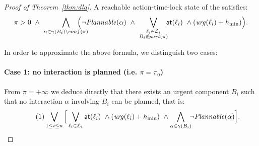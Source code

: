\begin{proof}[Proof of Theorem~\ref{thm:dla}]
A reachable action-time-lock state of the \lpsabrb satisfies:
\begin{displaymath}
  \pi>0 \ \wedge \ \bigwedge_{\substack{\alpha \in \gamma(B_i) \setminus conf(\pi)}} 
  \hspace*{-4ex} \Big(\neg\plntxt{\alpha} \ \wedge \ \bigvee_{\substack{\loc_i \in \Loc_i \\ 
  B_i \notin \p{\pi}}} \hspace*{-1ex} \al{\loc_i} \ \wedge(\urg(\loc_i) + \hmin)\Big).
\end{displaymath}

In order to approximate the above formula, we distinguish two cases:
\paragraph*{Case 1: no interaction is planned (i.e. $\pi = \pi_0$)\\}
From $\pi = +\infty$ we deduce directly that there exists an urgent component $B_i$ 
such that no interaction $\alpha$
involving $B_i$ can be planned, that is:
\begin{equation}
\label{eq:case1}\tag{1}
\bigvee_{\substack{1\le i\le n}}\Big[\bigvee_{\ell_i \in \mathcal{L}_i}\textsf{at}(\ell_i)\ \wedge(\textnormal{\textit{urg}}(\ell_i)
  +h_{\min}) \ \wedge\bigwedge_{\substack{\alpha \in \gamma(B_i)}} \hspace*{-1ex}\neg\mathit{Plannable(\alpha)}
  \Big].
\end{equation}


\end{proof}

